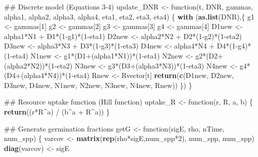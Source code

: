 \documentclass[11pt,]{article}
\newenvironment{Shaded}{\begin{snugshade}}{\end{snugshade}}
\newcommand{\KeywordTok}[1]{\textcolor[rgb]{0.13,0.29,0.53}{\textbf{{#1}}}}
\newcommand{\DecValTok}[1]{\textcolor[rgb]{0.00,0.00,0.81}{{#1}}}
\newcommand{\StringTok}[1]{\textcolor[rgb]{0.31,0.60,0.02}{{#1}}}
\newcommand{\NormalTok}[1]{{#1}}
\begin{document}
\begin{Shaded}
\begin{Highlighting}[]
  \NormalTok{## Discrete model (Equations 3-4)}
  \NormalTok{update_DNR <-}\StringTok{ }\NormalTok{function(t, DNR, gammas,}
                         \NormalTok{alpha1, alpha2, alpha3, alpha4,}
                         \NormalTok{eta1, eta2, eta3, eta4) \{}
    \KeywordTok{with} \NormalTok{(}\KeywordTok{as.list}\NormalTok{(DNR),\{}
      \NormalTok{g1    <-}\StringTok{ }\NormalTok{gammas[}\DecValTok{1}\NormalTok{]}
      \NormalTok{g2    <-}\StringTok{ }\NormalTok{gammas[}\DecValTok{2}\NormalTok{]}
      \NormalTok{g3    <-}\StringTok{ }\NormalTok{gammas[}\DecValTok{3}\NormalTok{]}
      \NormalTok{g4    <-}\StringTok{ }\NormalTok{gammas[}\DecValTok{4}\NormalTok{]}
      \NormalTok{D1new <-}\StringTok{ }\NormalTok{alpha1*N1 +}\StringTok{ }\NormalTok{D1*(}\DecValTok{1}\NormalTok{-g1)*(}\DecValTok{1}\NormalTok{-eta1)}
      \NormalTok{D2new <-}\StringTok{ }\NormalTok{alpha2*N2 +}\StringTok{ }\NormalTok{D2*(}\DecValTok{1}\NormalTok{-g2)*(}\DecValTok{1}\NormalTok{-eta2)}
      \NormalTok{D3new <-}\StringTok{ }\NormalTok{alpha3*N3 +}\StringTok{ }\NormalTok{D3*(}\DecValTok{1}\NormalTok{-g3)*(}\DecValTok{1}\NormalTok{-eta3)}
      \NormalTok{D4new <-}\StringTok{ }\NormalTok{alpha4*N4 +}\StringTok{ }\NormalTok{D4*(}\DecValTok{1}\NormalTok{-g4)*(}\DecValTok{1}\NormalTok{-eta4)}
      \NormalTok{N1new <-}\StringTok{ }\NormalTok{g1*(D1+(alpha1*N1))*(}\DecValTok{1}\NormalTok{-eta1)}
      \NormalTok{N2new <-}\StringTok{ }\NormalTok{g2*(D2+(alpha2*N2))*(}\DecValTok{1}\NormalTok{-eta2)}
      \NormalTok{N3new <-}\StringTok{ }\NormalTok{g3*(D3+(alpha3*N3))*(}\DecValTok{1}\NormalTok{-eta3)}
      \NormalTok{N4new <-}\StringTok{ }\NormalTok{g4*(D4+(alpha4*N4))*(}\DecValTok{1}\NormalTok{-eta4)}
      \NormalTok{Rnew  <-}\StringTok{ }\NormalTok{Rvector[t]}
      \KeywordTok{return}\NormalTok{(}\KeywordTok{c}\NormalTok{(D1new, D2new, D3new, D4new, N1new, N2new, N3new, N4new, Rnew))}
    \NormalTok{\})}
  \NormalTok{\}}
  
  \NormalTok{##  Resource uptake function (Hill function)}
  \NormalTok{uptake_R <-}\StringTok{ }\NormalTok{function(r, R, a, b) \{}
    \KeywordTok{return}\NormalTok{((r*R^a) /}\StringTok{ }\NormalTok{(b^a +}\StringTok{ }\NormalTok{R^a))}
  \NormalTok{\}}
  
  \NormalTok{##  Generate germination fractions}
  \NormalTok{getG <-}\StringTok{ }\NormalTok{function(sigE, rho, nTime, num_spp) \{}
    \NormalTok{varcov       <-}\StringTok{ }\KeywordTok{matrix}\NormalTok{(}\KeywordTok{rep}\NormalTok{(rho*sigE,num_spp*}\DecValTok{2}\NormalTok{), num_spp, num_spp)}
    \KeywordTok{diag}\NormalTok{(varcov) <-}\StringTok{ }\NormalTok{sigE}
    

\end{Highlighting}
\end{Shaded}
\end{document}
